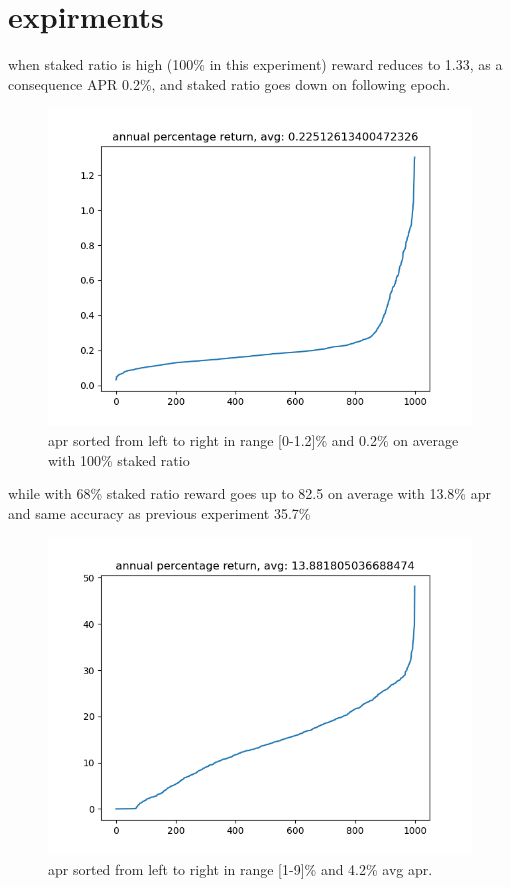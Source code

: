 \documentclass{article}
\begin{document}
\section{expirments}
\begin{description}
\item when staked ratio is high (100\% in this experiment) reward reduces to 1.33, as a consequence APR 0.2\%, and staked ratio goes down on following epoch.
  \begin{figure}
    \includegraphics{fullstake_apr.png}
    \caption{apr sorted from left to right in range [0-1.2]\% and 0.2\% on average with 100\% staked ratio}
  \end{figure}
\item while with 68\% staked ratio reward goes up to 82.5 on average with 13.8\% apr and same accuracy as previous experiment 35.7\%
  \begin{figure}
    \includegraphics{halfstake_apr.png}
    \caption{apr sorted from left to right in range [1-9]\% and 4.2\% avg apr.}
    \end{figure}
\end{description}
\end{document}
